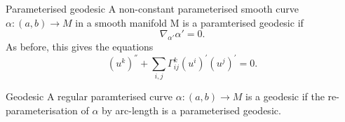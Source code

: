 \documentclass[twoside]{article}
\begin{document}
\begin{definition_exam}{Parameterised geodesic}{} A non-constant parameterised smooth curve $\alpha: (a,b) \rightarrow M$ in a smooth manifold M is a paramterised geodesic if 
$$
\nabla_{\alpha'}\alpha' = 0.
$$
As before, this gives the equations 
$$
(u^k)^{''} + \sum_{i, j}\Gamma_{ij}^{k}(u^i)^{'}(u^j)^{'} = 0.
$$
\end{definition_exam}

\begin{definition_exam}{Geodesic}{} A regular paramterised curve $\alpha: (a,b) \rightarrow M$ is a geodesic if the re-parameterisation of $\alpha$ by arc-length is a parameterised geodesic.
\end{definition_exam}
\end{document}
